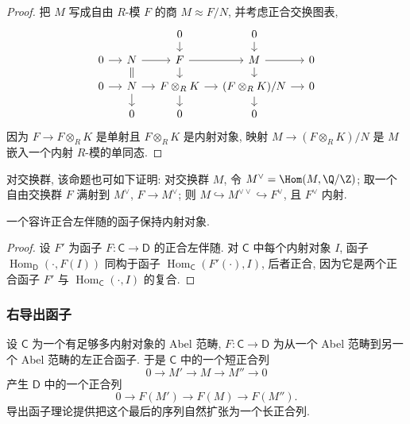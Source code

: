 \begin{proof}
把 $M$ 写成自由 $R$-模 $F$ 的商 $M\approx F/N$, 并考虑正合交换图表,
\[
\begin{tikzcd}[column sep=small, row sep=small]
	& & 0 & 0 \\
	0 & N & F & M & 0 \\
	0 & N & {F\otimes_R K} & {(F\otimes_R K)/N} & 0 \\
	& 0 & 0 & 0
	\arrow[from=1-3, to=2-3]
	\arrow[from=1-4, to=2-4]
	\arrow[from=2-1, to=2-2]
	\arrow[from=2-2, to=2-3]
	\arrow[from=2-3, to=2-4]
	\arrow[from=2-4, to=2-5]
	\arrow[equal, from=2-2, to=3-2]
	\arrow[from=2-3, to=3-3]
	\arrow[from=2-4, to=3-4]
	\arrow[from=3-1, to=3-2]
	\arrow[from=3-2, to=3-3]
	\arrow[from=3-3, to=3-4]
	\arrow[from=3-4, to=3-5]
	\arrow[from=3-2, to=4-2]
	\arrow[from=3-3, to=4-3]
	\arrow[from=3-4, to=4-4]
\end{tikzcd}
\]
因为 $F\to F\otimes_R K$ 是单射且 $F\otimes_R K$ 是内射对象, 映射 $M\to (F\otimes_R K)/N$ 是 $M$ 嵌入一个内射 $R$-模的单同态.
\end{proof}

对交换群, 该命题也可如下证明: 对交换群 $M$, 令 $M^\vee=\Hom(M,\Q/\Z)$; 取一个自由交换群 $F$ 满射到 $M^\vee$, $F\to M^\vee$; 则 $M\hookrightarrow M^{\vee\vee}\hookrightarrow F^\vee$, 且 $F^\vee$ 内射.

\begin{proposition}\label{prop:ii.A.5}
一个容许正合左伴随的函子保持内射对象.
\end{proposition}

\begin{proof}
设 $F'$ 为函子 $F\colon \mathsf{C}\to \mathsf{D}$ 的正合左伴随. 对 $\mathsf{C}$ 中每个内射对象 $I$, 函子 $\operatorname{Hom}_{\mathsf{D}}(\cdot,F(I))$ 同构于函子 $\operatorname{Hom}_{\mathsf{C}}(F'(\cdot),I)$, 后者正合, 因为它是两个正合函子 $F'$ 与 $\operatorname{Hom}_{\mathsf{C}}(\cdot,I)$ 的复合.
\end{proof}

\subsubsection*{右导出函子}

设 $\mathsf{C}$ 为一个有足够多内射对象的 Abel 范畴, $F\colon \mathsf{C}\to \mathsf{D}$ 为从一个 Abel 范畴到另一个 Abel 范畴的左正合函子. 于是 $\mathsf{C}$ 中的一个短正合列
\[
 0\to M'\to M\to M''\to 0
\]
产生 $\mathsf{D}$ 中的一个正合列
\[
 0\to F(M')\to F(M)\to F(M'').
\]
导出函子理论提供把这个最后的序列自然扩张为一个长正合列.

